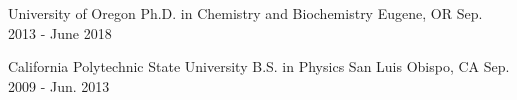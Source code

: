\begin{cvpoints}

  \cvpoint
    {University of Oregon} %
    {Ph.D. in Chemistry and Biochemistry} %
    {Eugene, OR} %
    {Sep. 2013 - June 2018} %

  \cvpoint
    {California Polytechnic State University} %
    {B.S. in Physics} %
    {San Luis Obispo, CA} %
    {Sep. 2009 - Jun. 2013} %
\end{cvpoints}
